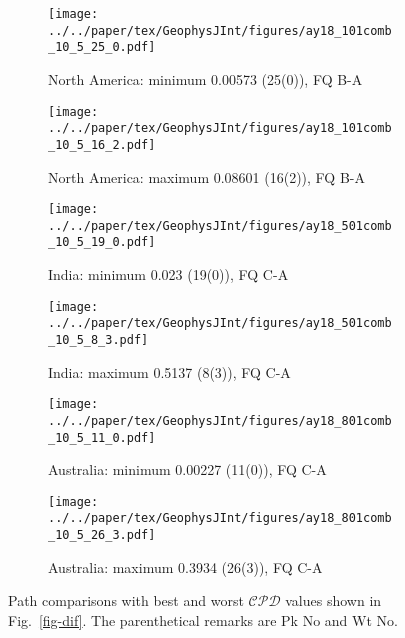 \begin{figure}
  \centering
  \begin{subfigure}{.42\textwidth} %
    \texttt{[image: ../../paper/tex/GeophysJInt/figures/ay18\_101comb\_10\_5\_25\_0.pdf]}
    \caption{North America: minimum 0.00573 (25(0)), FQ
      B-A}\label{fig-nac-105250}
  \end{subfigure}
  \begin{subfigure}{.42\textwidth} %
    \texttt{[image: ../../paper/tex/GeophysJInt/figures/ay18\_101comb\_10\_5\_16\_2.pdf]}
    \caption{North America: maximum 0.08601 (16(2)), FQ
      B-A}\label{fig-nac-105162}
  \end{subfigure}
  \vspace{.1em}
  \begin{subfigure}{.42\textwidth}
    \texttt{[image: ../../paper/tex/GeophysJInt/figures/ay18\_501comb\_10\_5\_19\_0.pdf]}
    \caption{India: minimum 0.023 (19(0)), FQ C-A}\label{fig-ind-105190}
  \end{subfigure}
  \begin{subfigure}{.42\textwidth}
    \texttt{[image: ../../paper/tex/GeophysJInt/figures/ay18\_501comb\_10\_5\_8\_3.pdf]}
    \caption{India: maximum 0.5137 (8(3)), FQ C-A}\label{fig-ind-10583}
  \end{subfigure}
  \vspace{.1em}
  \begin{subfigure}{.42\textwidth}
    \texttt{[image: ../../paper/tex/GeophysJInt/figures/ay18\_801comb\_10\_5\_11\_0.pdf]}
    \caption{Australia: minimum 0.00227 (11(0)), FQ C-A}\label{fig-au-105110}
  \end{subfigure}
  \begin{subfigure}{.42\textwidth}
    \texttt{[image: ../../paper/tex/GeophysJInt/figures/ay18\_801comb\_10\_5\_26\_3.pdf]}
    \caption{Australia: maximum 0.3934 (26(3)), FQ C-A}\label{fig-au-105263}
  \end{subfigure}
  \caption[Best and worst $\mathcal{CPD}$s (10/5 Myr window/step)]{Path
    comparisons with best and worst $\mathcal{CPD}$ values shown in
    Fig.~\ref{fig-dif}. The parenthetical remarks are Pk No and Wt No.}\label{fig-difbw}
\end{figure}

